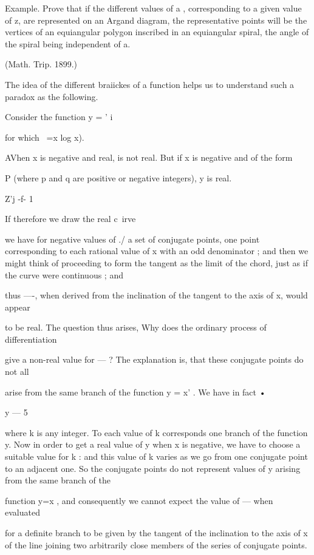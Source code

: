 {{{{Example. Prove that if the different values of a , corresponding to a
given value of z, are represented on an Argand diagram, the
representative points will be the vertices of an equiangular polygon
inscribed in an equiangular spiral, the angle of the spiral being
independent of a.

(Math. Trip. 1899.)

The idea of the different braiickes of a function helps us to
understand such a paradox as the following.

Consider the function y = ' i

for which ~=x log x).

AVhen x is negative and real, is not real. But if x is negative and of
the form

P (where p and q are positive or negative integers), y is real.

Z'j -f- 1

If therefore we draw the real c\ irve

we have for negative values of ./ a set of conjugate points, one point
corresponding to each rational value of x with an odd denominator ;
and then we might think of proceeding to form the tangent as the limit
of the chord, just as if the curve were continuous ; and

thus —-, when derived from the inclination of the tangent to the axis
of x, would appear

to be real. The question thus arises, Why does the ordinary process of
differentiation

give a non-real value for — ? The explanation is, that these conjugate
points do not all

arise from the same branch of the function y = x' . We have in fact •

y — 5

where k is any integer. To each value of k corresponds one branch of
the function y. Now in order to get a real value of y when x is
negative, we have to choose a suitable value for k : and this value of
k varies as we go from one conjugate point to an adjacent one. So the
conjugate points do not represent values of y arising from the same
branch of the

function y=x , and consequently we cannot expect the value of — when
evaluated

for a definite branch to be given by the tangent of the inclination to
the axis of x of the line joining two arbitrarily close members of the
series of conjugate points.



}}}}

